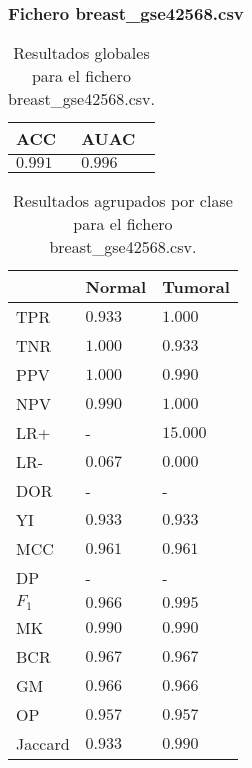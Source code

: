 \clearpage


\subsubsection{Fichero breast\_gse42568.csv}

\begin{table}[htp]
    \small
    \centering
    \begin{tabularx}{\columnwidth}{Y Y}
        ACC       & AUAC    \\\hline
        $0.991$   & $0.996$ \\\hline
    \end{tabularx}
    \caption{Resultados globales para el fichero breast\_gse42568.csv.}
    \label{tab:16}
\end{table}

\begin{table}[htp]
    \small
    \centering
    \begin{tabularx}{\columnwidth}{l Y Y}
                &  Normal               & Tumoral       \\\hline
        TPR     &  $0.933$              & $1.000$       \\\hline
        TNR     &  $1.000$              & $0.933$       \\\hline
        PPV     &  $1.000$              & $0.990$       \\\hline
        NPV     &  $0.990$              & $1.000$       \\\hline
        LR+     &  -                    & $15.000$      \\\hline
        LR-     &  $0.067$              & $0.000$       \\\hline
        DOR     &  -                    & -             \\\hline
        YI      &  $0.933$              & $0.933$       \\\hline
        MCC     &  $0.961$              & $0.961$       \\\hline
        DP      &  -                    & -             \\\hline
        $F_{1}$ &  $0.966$              & $0.995$       \\\hline
        MK      &  $0.990$              & $0.990$       \\\hline
        BCR     &  $0.967$              & $0.967$       \\\hline
        GM      &  $0.966$              & $0.966$       \\\hline
        OP      &  $0.957$              & $0.957$       \\\hline
        Jaccard &  $0.933$              & $0.990$       \\\hline
    \end{tabularx}
    \caption{Resultados agrupados por clase para el fichero breast\_gse42568.csv.}
    \label{tab:17}
\end{table}

